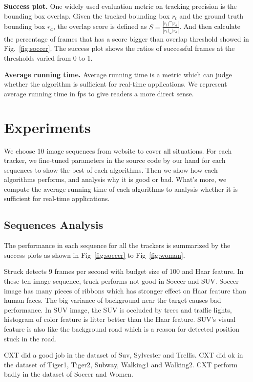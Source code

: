 \documentclass{acm_proc_article-sp}
\begin{document}
\textbf{Success plot.}
One widely used evaluation metric on tracking precision is the bounding box overlap. 
Given the tracked bounding box $r_t$ and the ground truth bounding box $r_a$, the overlap score is defined as $S = \frac{|r_t \bigcap r_a|}{|r_t \bigcup r_a|}$.
And then calculate the percentage of frames that has a score bigger than overlap threshold showed in Fig.~\ref{fig:soccer}.
The success plot shows the ratios of successful frames at the thresholds varied from 0 to 1. 

\textbf{Average running time.}
Average running time is a metric which can judge whether the algorithm is sufficient for real-time applications.
We represent average running time in fps to give readers a more direct sense.


\section{Experiments}

We choose 10 image sequences from website \cite{dataset} to cover all situations.
For each tracker, we fine-tuned parameters in the source code by our hand for each sequences to show the best of each algorithms. Then we show how each algorithms performs, and analysis why it is good or bad. What's more, we compute the average running time of each algorithms to analysis whether it is sufficient for real-time applications. 

\subsection{Sequences Analysis}

The performance in each sequence for all the trackers is summarized by the success plots as shown in Fig~\ref{fig:soccer} to Fig~\ref{fig:woman}.

Struck detects 9 frames per second with budget size of 100 and Haar feature.
In these ten image sequence, truck performs not good in Soccer and SUV.
Soccer image has many pieces of ribbons which has stronger effect on Haar feature than human faces.
The big variance of background near the target causes bad performance.
In SUV image, the SUV is occluded by trees and traffic lights, histogram of color feature is litter better than the Haar feature.
SUV's visual feature is also like the background road which is a reason for detected position stuck in the road.


CXT did a good job in the dataset of Suv, Sylvester and Trellis. CXT did ok in the dataset of Tiger1, Tiger2, Subway, Walking1 and Walking2. CXT perform badly in the dataset of Soccer and Women.
\end{document}
